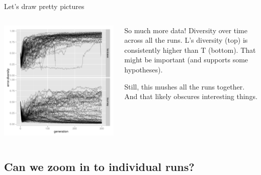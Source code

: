 \documentclass{beamer}
\newcommand{\linespace}{\vskip 0.25cm}
\begin{document}
\begin{frame}{Let's draw pretty pictures}
	
	\begin{columns}
		\begin{column}{0.55 \linewidth}
			\centering
			\includegraphics[width = \linewidth]{Figures/rswn_diversity.pdf}
		\end{column}
		
		\begin{column}{0.4 \linewidth}
			\begin{overprint}
				So much more data!
				\linespace
				Diversity over time across all the runs.
				\linespace
				L's diversity (top) is consistently higher than T (bottom).
				\linespace
				That might be important (and supports some hypotheses).
				
				Still, this mushes all the runs together.
				\linespace
				And that likely obscures interesting things.
			\end{overprint}
		\end{column}
	\end{columns}
\end{frame}

\subsection{Can we zoom in to individual runs?}
\end{document}
